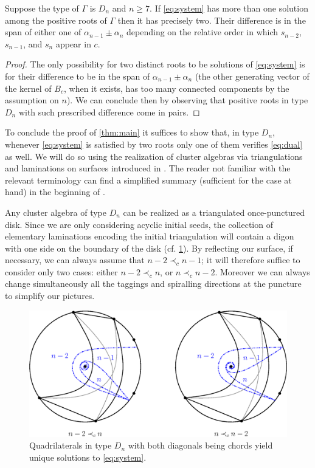 \documentclass[pdftex]{sigma}
\numberwithin{equation}{section}
\numberwithin{theorem}{section}
\numberwithin{proposition}{section}
\numberwithin{lemma}{section}
\numberwithin{corollary}{section}
\numberwithin{definition}{section}
\numberwithin{example}{section}
\numberwithin{remark}{section}
\numberwithin{note}{section}
\begin{document}
  \begin{corollary}
    \label{cor:kernel-Dn}
    Suppose the type of $\Gamma$ is $D_n$ and $n\geq 7$.
    If \cref{eq:system} has more than one solution among the positive roots of $\Gamma$ then it has precisely two.
    Their difference is in the span of either one of $\alpha_{n-1}\pm\alpha_n$ depending on the relative order in which $s_{n-2}$, $s_{n-1}$, and $s_n$ appear in $c$.
  \end{corollary}
  \begin{proof}
    The only possibility for two distinct roots to be solutions of \cref{eq:system} is for their difference to be in the span of $\alpha_{n-1}\pm\alpha_n$ (the other generating vector of the kernel of $B_c$, when it exists, has too many connected components by the assumption on $n$).
    We can conclude then by observing that positive roots in type $D_n$ with such prescribed difference come in pairs.
  \end{proof}

  To conclude the proof of \cref{thm:main} it suffices to show that, in type $D_n$, whenever \cref{eq:system} is satisfied by two roots only one of them verifies \cref{eq:dual} as well.
  We will do so using the realization of cluster algebras via triangulations and laminations on surfaces introduced in \cite{FST08,FT12}.
  The reader not familiar with the relevant terminology can find a simplified summary (sufficient for the case at hand) in the beginning of \cite[Section 4.1]{NS14}.

  Any cluster algebra of type $D_n$ can be realized as a triangulated once-punctured disk.
  Since we are only considering acyclic initial seeds, the collection of elementary laminations encoding the initial triangulation will contain a digon with one side on the boundary of the disk (cf. \cref{fig:D_n-roots}).
  By reflecting our surface, if necessary, we can always assume that $n-2 \prec_c n-1$; it will therefore suffice to consider only two cases: either $n-2 \prec_c n$, or $n \prec_c n-2$.
  Moreover we can always change simultaneously all the taggings and spiralling directions at the puncture to simplify our pictures.

  \begin{figure}
    \begin{center}
      \includegraphics[scale=0.7]{D_n-roots.eps}
    \end{center}
    \caption{Quadrilaterals in type $D_n$ with both diagonals being chords yield unique solutions to \cref{eq:system}.}
    \label{fig:D_n-roots}
  \end{figure}
\end{document}
